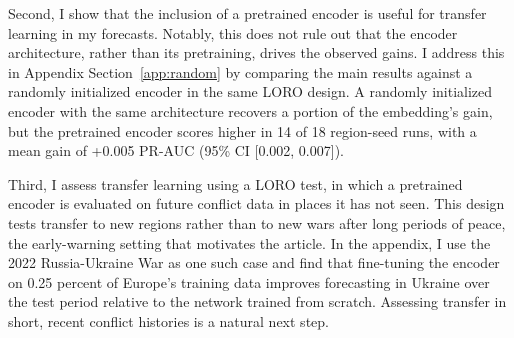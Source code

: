 \documentclass[11pt, letterpaper]{article}
\begin{document}
Second, I show that the inclusion of a pretrained encoder is useful for transfer learning in my forecasts. Notably, this does not rule out that the encoder architecture, rather than its pretraining, drives the observed gains. I address this in Appendix Section~\ref{app:random} by comparing the main results against a randomly initialized encoder in the same LORO design. A randomly initialized encoder with the same architecture recovers a portion of the embedding's gain, but the pretrained encoder scores higher in 14 of 18 region-seed runs, with a mean gain of +0.005 PR-AUC (95\% CI [0.002, 0.007]). 


Third, I assess transfer learning using a LORO test, in which a pretrained encoder is evaluated on future conflict data in places it has not seen. This design tests transfer to new regions rather than to new wars after long periods of peace, the early-warning setting that motivates the article. In the appendix, I use the 2022 Russia-Ukraine War as one such case and find that fine-tuning the encoder on 0.25 percent of Europe's training data improves forecasting in Ukraine over the test period relative to the network trained from scratch. Assessing transfer in short, recent conflict histories is a natural next step. 

\end{document}
